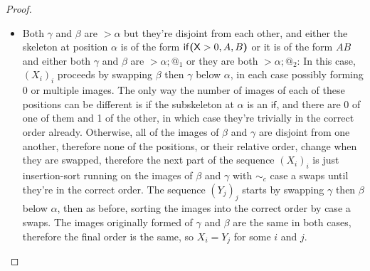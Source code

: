 \begin{proof}
\begin{itemize}
\item Both $\gamma$ and $\beta$ are $> \alpha$ but they're disjoint from each other, and either the skeleton at position $\alpha$ is of the form $\mathsf{if}\boldsymbol{(}\mathsf{X} > 0, A, B\boldsymbol{)}$ or it is of the form $A B$ and either both $\gamma$ and $\beta$ are $> \alpha;@_1$ or they are both $> \alpha;@_2$: In this case, $(X_i)_i$ proceeds by swapping $\beta$ then $\gamma$ below $\alpha$, in each case possibly forming 0 or multiple images. The only way the number of images of each of these positions can be different is if the subskeleton at $\alpha$ is an $\textsf{if}$, and there are 0 of one of them and 1 of the other, in which case they're trivially in the correct order already. Otherwise, all of the images of $\beta$ and $\gamma$ are disjoint from one another, therefore none of the positions, or their relative order, change when they are swapped, therefore the next part of the sequence $(X_i)_i$ is just insertion-sort running on the images of $\beta$ and $\gamma$ with $\sim_c$ case a swaps until they're in the correct order. The sequence $(Y_j)_j$ starts by swapping $\gamma$ then $\beta$ below $\alpha$, then as before, sorting the images into the correct order by case a swaps. The images originally formed of $\gamma$ and $\beta$ are the same in both cases, therefore the final order is the same, so $X_i = Y_j$ for some $i$ and $j$.

\end{itemize}
\end{proof}
